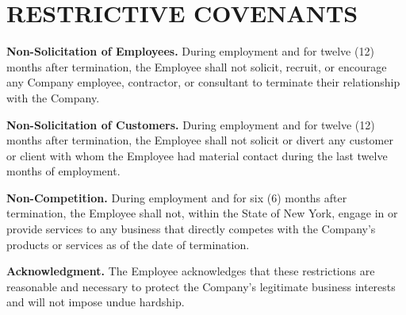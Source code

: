 \section{RESTRICTIVE COVENANTS}

\parsp
\textbf{Non-Solicitation of Employees.} During employment and for twelve (12) months after termination, the Employee shall not solicit, recruit, or encourage any Company employee, contractor, or consultant to terminate their relationship with the Company.

\parsp
\textbf{Non-Solicitation of Customers.} During employment and for twelve (12) months after termination, the Employee shall not solicit or divert any customer or client with whom the Employee had material contact during the last twelve months of employment.

\parsp
\textbf{Non-Competition.} During employment and for six (6) months after termination, the Employee shall not, within the State of New York, engage in or provide services to any business that directly competes with the Company's products or services as of the date of termination.

\parsp
\textbf{Acknowledgment.} The Employee acknowledges that these restrictions are reasonable and necessary to protect the Company's legitimate business interests and will not impose undue hardship.

